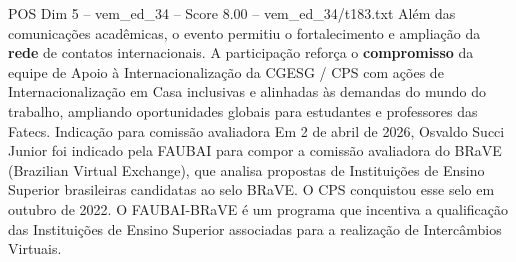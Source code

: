 \begin{textsample}{POS Dim 5 – vem\_ed\_34 – Score 8.00 – vem\_ed\_34/t183.txt}
Além das comunicações acadêmicas, o evento permitiu o fortalecimento e ampliação da \textbf{rede} de contatos internacionais.
A participação reforça o \textbf{compromisso} da equipe de Apoio à Internacionalização da CGESG / CPS com ações de Internacionalização em Casa inclusivas e alinhadas às demandas do mundo do trabalho, ampliando oportunidades globais para estudantes e professores das Fatecs.
Indicação para comissão avaliadora Em 2 de abril de 2026, Osvaldo Succi Junior foi indicado pela FAUBAI para compor a comissão avaliadora do BRaVE (Brazilian Virtual Exchange), que analisa propostas de Instituições de Ensino Superior brasileiras candidatas ao selo BRaVE.
O CPS conquistou esse selo em outubro de 2022.
O FAUBAI-BRaVE é um programa que incentiva a qualificação das Instituições de Ensino Superior associadas para a realização de Intercâmbios Virtuais.

\end{textsample}
